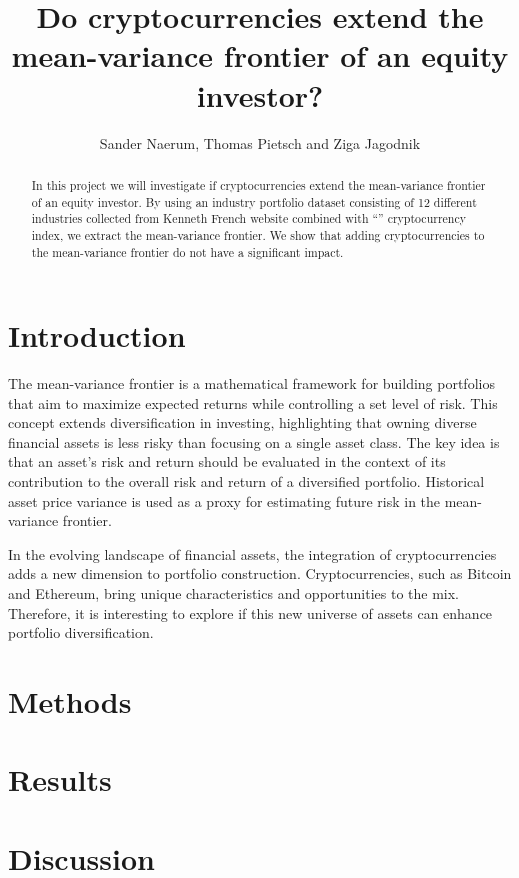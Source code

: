 \documentclass[12pt,a4paper]{article}
\title{Do cryptocurrencies extend the mean-variance frontier of an equity investor?}
\author{Sander Naerum, Thomas Pietsch and Ziga Jagodnik}
\begin{document}
\maketitle

\begin{abstract}
In this project we will investigate if cryptocurrencies extend the mean-variance frontier of an equity investor. By using an industry portfolio dataset consisting of 12 different industries collected from Kenneth French website combined with “” cryptocurrency index, we extract the mean-variance frontier. We show that adding cryptocurrencies to the mean-variance frontier do not have a significant impact.  
\end{abstract}

\section{Introduction}\label{sec:intro}
The mean-variance frontier is a mathematical framework for building portfolios that aim to maximize expected returns while controlling a set level of risk. This concept extends diversification in investing, highlighting that owning diverse financial assets is less risky than focusing on a single asset class. The key idea is that an asset's risk and return should be evaluated in the context of its contribution to the overall risk and return of a diversified portfolio. Historical asset price variance is used as a proxy for estimating future risk in the mean-variance frontier.

In the evolving landscape of financial assets, the integration of cryptocurrencies adds a new dimension to portfolio construction. Cryptocurrencies, such as Bitcoin and Ethereum, bring unique characteristics and opportunities to the mix. Therefore, it is interesting to explore if this new universe of assets can enhance portfolio diversification. 

\section{Methods}\label{sec:methods}

\section{Results}\label{sec:result}

\section{Discussion}\label{sec:discussion}
\end{document}
